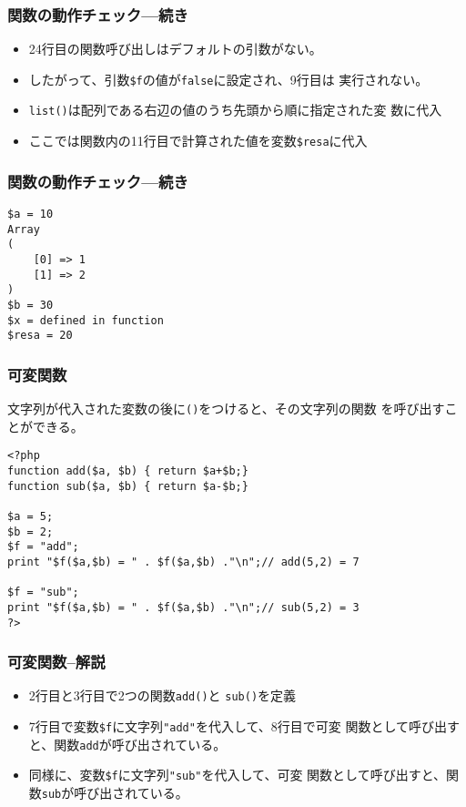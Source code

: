 \documentclass[dvipsk]{beamer}
\begin{document}
\begin{frame}[containsverbatim]
\frametitle{関数の動作チェック---続き}
\begin{itemize}
 \item 24行目の関数呼び出しはデフォルトの引数がない。
 \item したがって、引数\verb+$f+の値が\texttt{false}に設定され、9行目は
       実行されない。
 \item \texttt{list()}は配列である右辺の値のうち先頭から順に指定された変
       数に代入
 \item ここでは関数内の11行目で計算された値を変数\verb+$resa+に代入
\end{itemize}
\end{frame}
\begin{frame}[containsverbatim]
\frametitle{関数の動作チェック---続き}
\begin{verbatim}
$a = 10
Array
(
    [0] => 1
    [1] => 2
)
$b = 30
$x = defined in function
$resa = 20
\end{verbatim}
\end{frame}
 \begin{frame}[containsverbatim]
  \frametitle{可変関数}
 文字列が代入された変数の後に\texttt{()}をつけると、その文字列の関数
  を呼び出すことができる。
  {\small
\begin{verbatim}
<?php
function add($a, $b) { return $a+$b;}
function sub($a, $b) { return $a-$b;}

$a = 5;
$b = 2;
$f = "add";
print "$f($a,$b) = " . $f($a,$b) ."\n";// add(5,2) = 7

$f = "sub";
print "$f($a,$b) = " . $f($a,$b) ."\n";// sub(5,2) = 3
?>
\end{verbatim}
  }
 \end{frame}
  \begin{frame}[containsverbatim]
  \frametitle{可変関数--解説}
\begin{itemize}
\item 2行目と3行目で2つの関数\texttt{add()}と
       \texttt{sub()}を定義
 \item 7行目で変数\verb+$f+に文字列\verb+"add"+を代入して、8行目で可変
       関数として呼び出すと、関数\texttt{add}が呼び出されている。
 \item 同様に、変数\verb+$f+に文字列\verb+"sub"+を代入して、可変
       関数として呼び出すと、関数\texttt{sub}が呼び出されている。
\end{itemize}
\end{frame}
\end{document}
